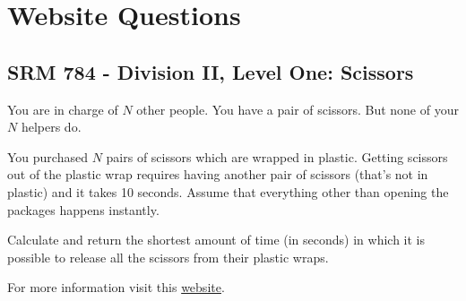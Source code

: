 \documentclass{book}
\begin{document}
	\section{Website Questions}
	\subsection{SRM 784 - Division II, Level One: Scissors}
	You are in charge of $N$ other people. You have a pair of scissors. But none of your $N$ helpers do. 
	\par You purchased $N$ pairs of scissors which are wrapped in plastic. Getting scissors out of the plastic wrap requires having another pair of scissors (that's not in plastic) and it takes 10 seconds. Assume that everything other than opening the packages happens instantly.
	\par Calculate and return the shortest amount of time (in seconds) in which it is possible to release all the scissors from their plastic wraps.
	\par For more information visit this \href{https://community.topcoder.com/stat?c=problem_statement&pm=16110}{website}.
\end{document}
